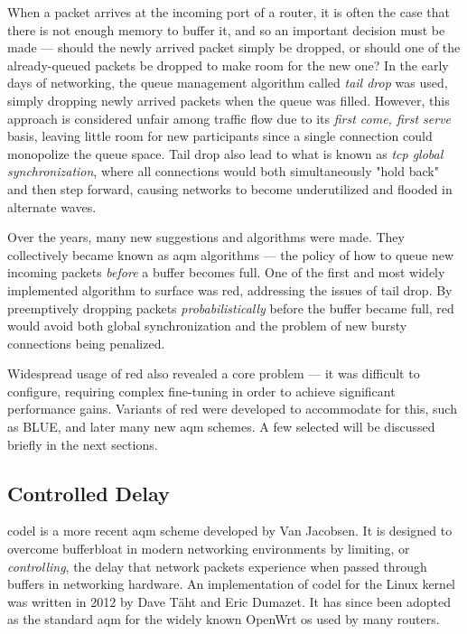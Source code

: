 When a packet arrives at the incoming port of a router, it is often the case that there is not enough memory to buffer it, and so an important decision must be made --- should the newly arrived packet simply be dropped, or should one of the already-queued packets be dropped to make room for the new one? In the early days of networking, the queue management algorithm called \textit{tail drop} was used, simply dropping newly arrived packets when the queue was filled. However, this approach is considered unfair among traffic flow due to its \textit{first come, first serve} basis, leaving little room for new participants since a single connection could monopolize the queue space. \cite{on_traffic_phase_effects_in_packet_switched_gateways} Tail drop also lead to what is known as \textit{\gls{tcp} global synchronization}, where all connections would both simultaneously "hold back" and then step forward, causing networks to become underutilized and flooded in alternate waves.

Over the years, many new suggestions and algorithms were made. They collectively became known as \gls{aqm} algorithms --- the policy of how to queue new incoming packets \textit{before} a buffer becomes full. One of the first and most widely implemented algorithm to surface was \gls{red}, addressing the issues of tail drop. By preemptively dropping packets \textit{probabilistically} before the buffer became full, \gls{red} would avoid both global synchronization and the problem of new bursty connections being penalized. \cite{ieee251892}

Widespread usage of \gls{red} also revealed a core problem --- it was difficult to configure, requiring complex fine-tuning in order to achieve significant performance gains. Variants of \gls{red} were developed to accommodate for this, such as BLUE, and later many new \gls{aqm} schemes. A few selected will be discussed briefly in the next sections.



\subsection{Controlled Delay}

\gls{codel} is a more recent \gls{aqm} scheme developed by Van Jacobsen. It is designed to overcome bufferbloat in modern networking environments by limiting, or \textit{controlling}, the delay that network packets experience when passed through buffers in networking hardware. An implementation of \gls{codel} for the Linux kernel was written in 2012 by Dave Täht and Eric Dumazet. It has since been adopted as the standard \gls{aqm} for the widely known OpenWrt \gls{os} used by many routers.

